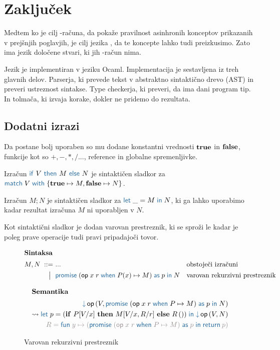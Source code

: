 \section{Zaključek}\label{sec:konec}

Medtem ko je cilj \lae-računa, da pokaže pravilnost asinhronih konceptov prikazanih v prejšnjih poglavjih, je cilj jezika \aeff{}, da te koncepte lahko tudi preizkusimo. Zato ima jezik \aeff{} določene stvari, ki jih \lae-račun nima.

Jezik \aeff{} je implementiran v jeziku Ocaml. Implementacija je sestavljena iz treh glavnih delov.
Parserja, ki prevede tekst v abstraktno sintaktično drevo (AST) in preveri ustreznost sintakse.  
Type checkerja, ki preveri, da ima dani program tip.
In tolmača, ki izvaja korake, dokler ne pridemo do rezultata.

\subsection{Dodatni izrazi}

Da \aeff{} postane bolj uporaben so mu dodane konstantni vrednosti $\mathbf{true}$ in $\mathbf{false}$, funkcije kot so $+, -, *, / ...$, reference in globalne spremenljivke.

Izračun $\tmkw{if}\ V\ \tmkw{then}\ M\ \tmkw{else}\ N$ je sintaktičen sladkor za $\tmmatch{V}{\true \mapsto M, \false \mapsto N}$.

Izračun $M;N$ je sintaktičen sladkor za $\tmlet{\_}{M}{N}$, ki ga lahko uporabimo kadar rezultat izračuna $M$ ni uporabljen v $N$.

Kot sintaktični sladkor je dodan varovan prestreznik, ki se sproži le kadar je poleg prave operacije tudi pravi pripadajoči tovor.
\begin{figure}[h]
	\centering
	\small
	\begin{align*}
	\intertext{\textbf{Sintaksa}}
	M, N
	\bnfis& ...                            & &\text{obstoječi izračuni} \\
	\bnfor& \tmwithrecgu{op}{x}{r}{P(x)}{M}{p}{N}  & &\text{varovan rekurzivni prestreznik}
	\end{align*}
	
	\begin{align*}
	\intertext{\textbf{Semantika}}
	\tmopin{op}{V}{\tmwithrecgu{op}{x}{r}{P}{M}{p}{N}} \\ \reduces \tmlet{p}{(\ite{P[V/x]}{M[V/x, R/r]}{R\,()})}{\tmopin{op}{V}{N}} \\
	{\color{rulenameColor}R = \tmfunano{y}{(\tmwithrecgu{op}{x}{r}{P}{M}{p}{\tmreturn{p}})}}
	\end{align*}
	
	\caption{Varovan rekurzivni prestreznik}
	\label{fig:izrazi-varovan-prestreznik}
\end{figure}

